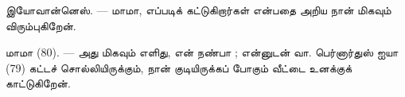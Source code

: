 %
%
%
%

\VUsaut{6.0mm}
\VUsaut{1.4mm}
\VUsaut{2.2mm}

\VUsaut{3.0mm}

\textsc{இயோவான்னெஸ்}. --- மாமா,  எப்படிக் கட்டுகிறார்கள்
என்பதை அறிய நான் மிகவும் விரும்புகிறேன்.

\textsc{மாமா} (80). --- அது மிகவும் எளிது, என் நண்பா ; என்னுடன் வா.
பெர்னார்துஸ் ஐயா (79) கட்டச் சொல்லியிருக்கும், நான் குடியிருக்கப் போகும்
வீட்டை உனக்குக் காட்டுகிறேன்.

